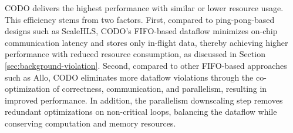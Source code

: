 \documentclass[conference]{IEEEtran}
\begin{document}
CODO delivers the highest performance with similar or lower resource usage. This efficiency stems from two factors. First, compared to ping-pong-based designs such as ScaleHLS, CODO's FIFO-based dataflow minimizes on-chip communication latency and stores only in-flight data, thereby achieving higher performance with reduced resource consumption, as discussed in Section \ref{sec:background-violation}. Second, compared to other FIFO-based approaches such as Allo, CODO eliminates more dataflow violations through the co-optimization of correctness, communication, and parallelism, resulting in improved performance. In addition, the parallelism downscaling step removes redundant optimizations on non-critical loops, balancing the dataflow while conserving computation and memory resources.
\end{document}
